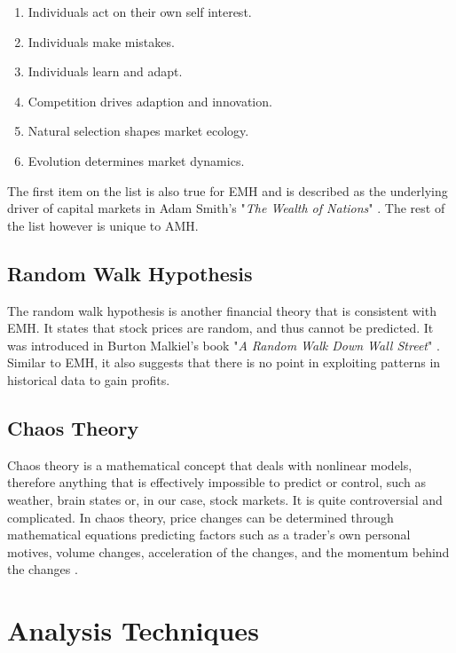 \documentclass{UoYCSproject}
\begin{document}
\begin{enumerate}
\item Individuals act on their own self interest.
\item Individuals make mistakes.
\item Individuals learn and adapt.
\item Competition drives adaption and innovation.
\item Natural selection shapes market ecology.
\item Evolution determines market dynamics.
\end{enumerate}

The first item on the list is also true for EMH and is described as the underlying driver of capital markets in Adam Smith's "\textit{The Wealth of Nations}" \cite{smith1957}. The rest of the list however is unique to AMH.

\subsection{Random Walk Hypothesis}
The random walk hypothesis is another financial theory that is consistent with EMH. It states that stock prices are random, and thus cannot be predicted. It was introduced in Burton Malkiel's book "\textit{A Random Walk Down Wall Street}" \cite{malkiel1973random}. Similar to EMH, it also suggests that there is no point in exploiting patterns in historical data to gain profits.  

\subsection{Chaos Theory}
Chaos theory is a mathematical concept that deals with nonlinear models, therefore anything that is effectively impossible to predict or control, such as weather, brain states or, in our case, stock markets. It is quite controversial and complicated. In chaos theory, price changes can be determined through mathematical equations predicting factors such as a trader's own personal motives, volume changes, acceleration of the changes, and the momentum behind the changes \cite{chaostheory}.

\section{Analysis Techniques}
\end{document}
